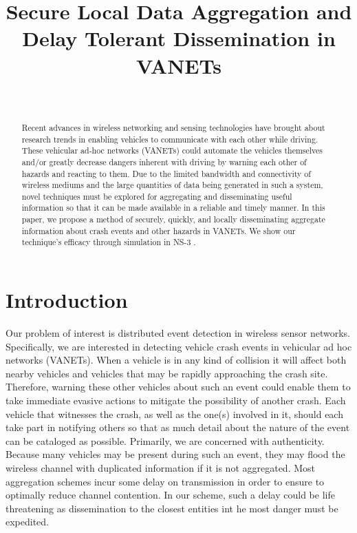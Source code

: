 \documentclass{IEEEtran}
\begin{document}
\title{Secure Local Data Aggregation and Delay Tolerant Dissemination in VANETs}
\author{\\
}
\maketitle

\begin{abstract}

Recent advances in wireless networking and sensing technologies have brought about research trends in enabling vehicles to communicate with each other while driving.  These vehicular ad-hoc networks (VANETs) could automate the vehicles themselves and/or greatly decrease dangers inherent with driving by warning each other of hazards and reacting to them.
Due to the limited bandwidth and connectivity of wireless mediums and the large quantities of data being generated in such a system, novel techniques must be explored for aggregating and disseminating useful information so that it can be made available in a reliable and timely manner.
In this paper, we propose a method of securely, quickly, and locally disseminating aggregate information about crash events and other hazards in VANETs.
We show our technique's efficacy through simulation in NS-3 \cite{ns3}.
\end{abstract}

\section{Introduction}

Our problem of interest is distributed event detection in wireless sensor networks. Specifically, we are interested in detecting vehicle crash events in vehicular ad hoc networks (VANETs).
When a vehicle is in any kind of collision it will affect both nearby vehicles and vehicles that may be rapidly approaching the crash site.
Therefore, warning these other vehicles about such an event could enable them to take immediate evasive actions to mitigate the possibility of another crash. 
Each vehicle that witnesses the crash, as well as the one(s) involved in it, should each take part in notifying others so that as much detail about the nature of the event can be cataloged as possible. Primarily, we are concerned with authenticity. 
Because many vehicles may be present during such an event, they may flood the wireless channel with duplicated information if it is not aggregated. Most aggregation schemes incur some delay on transmission in order to ensure to optimally reduce channel contention. In our scheme, such a delay could be life threatening as dissemination to the closest entities int he most danger must be expedited. 
\end{document}
